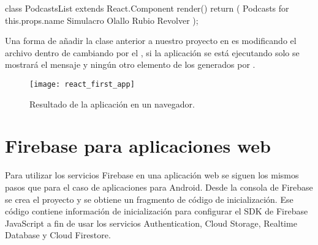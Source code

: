%
\begin{sphinxVerbatim}[commandchars=\\\{\}]
class PodcastsList extends React.Component \PYGZob{}
  render() \PYGZob{}
    return (
       
        Podcasts for \PYGZob{}this.props.name\PYGZcb{}
          Simulacro
          Olallo Rubio
          Revolver
    );\PYGZcb{}\PYGZcb{}
\end{sphinxVerbatim}

Una forma de añadir la clase anterior a nuestro proyecto
en  es modificando el archivo  dentro
de  cambiando  por el , si la aplicación
se está ejecutando solo se mostrará el mensaje y ningún otro elemento de los
generados por .


\begin{figure}[ht]
\centering
\caption{Resultado de la aplicación en un navegador.}
\texttt{[image: react\_first\_app]}
\end{figure}


\section*{Firebase para aplicaciones web}

Para utilizar los servicios Firebase en una aplicación web
se siguen los mismos pasos que para el caso de 
aplicaciones para Android. Desde la consola de Firebase
se crea el proyecto y se obtiene un fragmento de código
de inicialización. Ese código  contiene información de inicialización para configurar el SDK de Firebase JavaScript a fin de usar los servicios Authentication, Cloud Storage, Realtime Database y Cloud Firestore.


